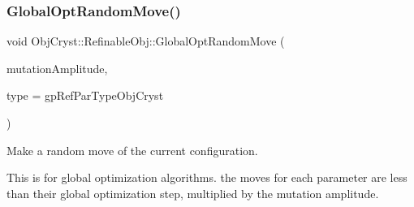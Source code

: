 \subsubsection{\texorpdfstring{GlobalOptRandomMove()}{GlobalOptRandomMove()}}
{\footnotesize\ttfamily void Obj\+Cryst\+::\+Refinable\+Obj\+::\+Global\+Opt\+Random\+Move (\begin{DoxyParamCaption}\item[{const R\+E\+AL}]{mutation\+Amplitude,  }\item[{const \mbox{\hyperlink{class_obj_cryst_1_1_ref_par_type}{Ref\+Par\+Type}} $\ast$}]{type = {\ttfamily gpRefParTypeObjCryst} }\end{DoxyParamCaption})\hspace{0.3cm}{\ttfamily [virtual]}}

Make a random move of the current configuration.

This is for global optimization algorithms. the moves for each parameter are less than their global optimization step, multiplied by the mutation amplitude.

